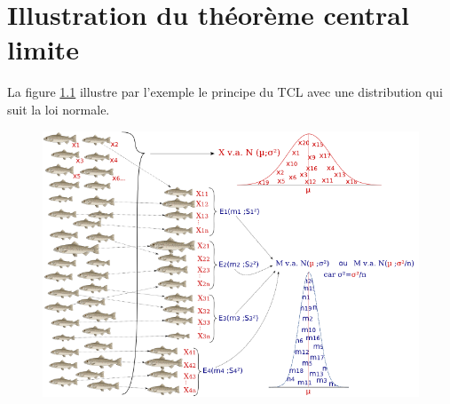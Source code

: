 



















































		\appendix
		
		\chapter{Illustration du théorème central limite} \label{appendix:clt-exemple}
		La figure \ref{fig:tcl} illustre par l'exemple le principe du TCL avec une distribution qui suit la loi normale. 
		\begin{figure}[H]
			\centering
			\includegraphics[width=1\linewidth]{illustrations/tcl}
			\caption{}
			\label{fig:tcl}
			
		\end{figure}
		
		
		
		
		
		
		
		
		
		
		
		
		
		
		






